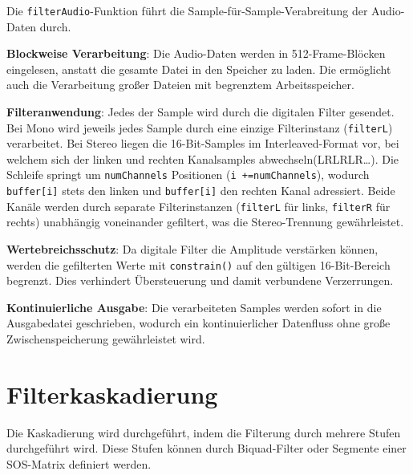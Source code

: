 \documentclass[
  ngerman,
  letterpaper,
  DIV=11]{scrreprt}
\begin{document}
Die \texttt{filterAudio}-Funktion führt die
Sample-für-Sample-Verabreitung der Audio-Daten durch.

\textbf{Blockweise Verarbeitung}: Die Audio-Daten werden in
512-Frame-Blöcken eingelesen, anstatt die gesamte Datei in den Speicher
zu laden. Die ermöglicht auch die Verarbeitung großer Dateien mit
begrenztem Arbeitsspeicher.

\textbf{Filteranwendung}: Jedes der Sample wird durch die digitalen
Filter gesendet. Bei Mono wird jeweils jedes Sample durch eine einzige
Filterinstanz (\texttt{filterL}) verarbeitet. Bei Stereo liegen die
16-Bit-Samples im Interleaved-Format vor, bei welchem sich der linken
und rechten Kanalsamples abwechseln(LRLRLR\ldots). Die Schleife springt
um \texttt{numChannels} Positionen (\texttt{i\ +=numChannels}), wodurch
\texttt{buffer{[}i{]}} stets den linken und \texttt{buffer{[}i{]}} den
rechten Kanal adressiert. Beide Kanäle werden durch separate
Filterinstanzen (\texttt{filterL} für links, \texttt{filterR} für
rechts) unabhängig voneinander gefiltert, was die Stereo-Trennung
gewährleistet.

\textbf{Wertebreichsschutz}: Da digitale Filter die Amplitude verstärken
können, werden die gefilterten Werte mit \texttt{constrain()} auf den
gültigen 16-Bit-Bereich begrenzt. Dies verhindert Übersteuerung und
damit verbundene Verzerrungen.

\textbf{Kontinuierliche Ausgabe}: Die verarbeiteten Samples werden
sofort in die Ausgabedatei geschrieben, wodurch ein kontinuierlicher
Datenfluss ohne große Zwischenspeicherung gewährleistet wird.

\section{Filterkaskadierung}\label{filterkaskadierung}

Die Kaskadierung wird durchgeführt, indem die Filterung durch mehrere
Stufen durchgeführt wird. Diese Stufen können durch Biquad-Filter oder
Segmente einer SOS-Matrix definiert werden.
\end{document}
